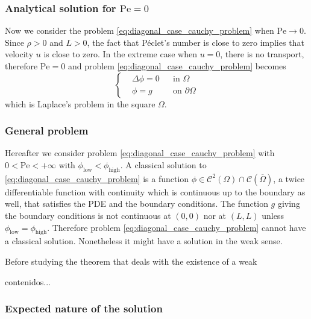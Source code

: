 \subsubsection{Analytical solution for \texorpdfstring{$\mathrm{Pe} = 0$}{zero Péclet's number}}

Now we consider the problem \eqref{eq:diagonal_case_cauchy_problem} when $\mathrm{Pe} \to 0$. Since $\rho > 0$ and $L > 0$, the fact that Péclet's number is close to zero implies that velocity $u$ is close to zero. In the extreme case when $u = 0$, there is no transport, therefore $\mathrm{Pe} = 0$ and problem \eqref{eq:diagonal_case_cauchy_problem} becomes
\begin{equation} \label{eq:diagonal_case_cauchy_problem_zero_peclet}
	\left\{
	\begin{aligned}
		&\Delta \phi = 0 &
		&\text{in } \Omega \\
		&\phi = g &
		&\text{on } \partial \Omega
	\end{aligned}
	\right.
\end{equation}
which is Laplace's problem in the square $\Omega$. 

\subsubsection{General problem}

Hereafter we consider problem \eqref{eq:diagonal_case_cauchy_problem} with $0 < \mathrm{Pe} < +\infty$ with $\phi_\text{low} < \phi_\text{high}$. A classical solution to \eqref{eq:diagonal_case_cauchy_problem} is a function $\phi \in \mathcal{C}^2(\Omega) \cap \mathcal{C}(\overline{\Omega})$, \ie a twice differentiable function with continuity which is continuous up to the boundary as well, that satisfies the PDE and the boundary conditions. The function $g$ giving the boundary conditions is not continuous at $(0,0)$ nor at $(L, L)$ unless $\phi_\text{low} = \phi_\text{high}$. Therefore problem \eqref{eq:diagonal_case_cauchy_problem} cannot have a classical solution. Nonetheless it might have a solution in the weak sense.

Before studying the theorem that deals with the existence of a weak 

\begin{definition}
	contenidos...
\end{definition}

\subsubsection{Expected nature of the solution}